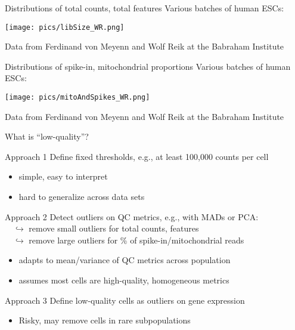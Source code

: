 \documentclass{beamer}
\begin{document}
\begin{frame}{Distributions of total counts, total features}
    Various batches of human ESCs:
    \begin{center}
        \texttt{[image: pics/libSize\_WR.png]}
    \end{center}
    {\tiny Data from Ferdinand von Meyenn and Wolf Reik at the Babraham Institute}
\end{frame}
    
\begin{frame}{Distributions of spike-in, mitochondrial proportions}
    Various batches of human ESCs:
    \begin{center}
        \texttt{[image: pics/mitoAndSpikes\_WR.png]}
    \end{center}
    {\tiny Data from Ferdinand von Meyenn and Wolf Reik at the Babraham Institute}
\end{frame}

\begin{frame}{What is ``low-quality''?}
    \begin{exampleblock}{Approach 1}
        Define fixed thresholds, e.g., at least 100,000 counts per cell
        \begin{itemize}
            \item simple, easy to interpret
            \item hard to generalize across data sets 
        \end{itemize}
    \end{exampleblock}
    \pause
    \begin{exampleblock}{Approach 2}
        Detect outliers on QC metrics, e.g., with MADs or PCA: \\
        $\quad\hookrightarrow$ remove small outliers for total counts, features \\
        $\quad\hookrightarrow$ remove large outliers for \% of spike-in/mitochondrial reads
        \begin{itemize}
            \item adapts to mean/variance of QC metrics across population
            \item assumes most cells are high-quality, homogeneous metrics
        \end{itemize}
    \end{exampleblock}
    \pause
    \begin{alertblock}{Approach 3}
        Define low-quality cells as outliers on gene expression
        \begin{itemize}
            \item Risky, may remove cells in rare subpopulations
        \end{itemize}
    \end{alertblock}
\end{frame}
\end{document}
